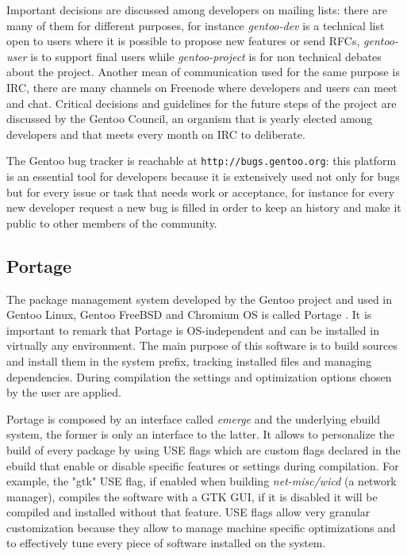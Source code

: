 Important decisions are discussed among developers on mailing lists: there are many of them for different purposes, for instance \emph{gentoo-dev} is a technical list open to users where it is possible to propose new features or send RFCs, \emph{gentoo-user} is to support final users while \emph{gentoo-project} is for non technical debates about the project. Another mean of communication used for the same purpose is IRC, there are many channels on Freenode \cite{gentoo_irc} where developers and users can meet and chat.
Critical decisions and guidelines for the future steps of the project are discussed by the Gentoo Council, an organism that is yearly elected among developers and that meets every month on IRC to deliberate.

The Gentoo bug tracker is reachable at \texttt{http://bugs.gentoo.org}: this platform is an essential tool for developers because it is extensively used not only for bugs but for every issue or task that needs work or acceptance, for instance for every new developer request a new bug is filled in order to keep an history and make it public to other members of the community.



\subsection{Portage}
The package management system developed by the Gentoo project and used in Gentoo Linux, Gentoo FreeBSD and Chromium OS is called Portage \cite{gentoo_portage}. It is important to remark that Portage is OS-independent and can be installed in virtually any environment.
The main purpose of this software is to build sources and install them in the system prefix, tracking installed files and managing dependencies. During compilation the settings and optimization options chosen by the user are applied.

Portage is composed by an interface called \emph{emerge} and the underlying ebuild system, the former is only an interface to the latter. It allows to personalize the build of every package by using USE flags which are custom flags declared in the ebuild that enable or disable specific features or settings during compilation. For example, the "gtk" USE flag, if enabled when building \emph{net-misc/wicd} (a network manager), compiles the software with a GTK GUI, if it is disabled it will be compiled and installed without that feature. USE flags allow very granular customization because they allow to manage machine specific optimizations and to effectively tune every piece of software installed on the system.


